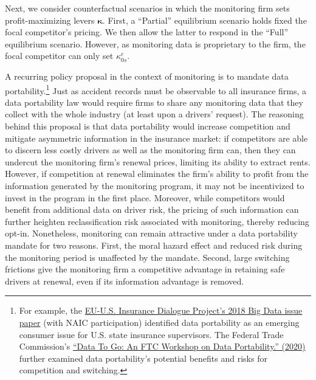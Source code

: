 Next, we consider counterfactual scenarios in which the monitoring firm sets profit-maximizing levers $\boldsymbol{\kappa}$. First, a ``Partial'' equilibrium scenario holds fixed the focal competitor's pricing. We then allow the latter to respond in the ``Full'' equilibrium scenario. However, as monitoring data is proprietary to the firm, the focal competitor can only set $\kappa^c_{0s}$.

A recurring policy proposal in the context of monitoring is to mandate data portability.\footnote{For example, the \href{https://home.treasury.gov/system/files/311/181031_EU\%20US\%20Big\%20Data\%20\%20Issue\%20Paper\_Publication.pdf}{EU-U.S. Insurance Dialogue Project's 2018 Big Data issue paper} (with NAIC participation) identified data portability as an emerging consumer issue for U.S. state insurance supervisors. The Federal Trade Commission's
\href{https://www.ftc.gov/system/files/documents/public_events/1568699/transcript-data-portability-workshop-final.pdf}{``Data To Go: An FTC Workshop on Data Portability.'' (2020)}
further examined data portability's potential benefits and risks for competition and switching.
} Just as accident records must be observable to all insurance firms, a data portability law would require firms to share any monitoring data that they collect with the whole industry (at least upon a drivers' request). The reasoning behind this proposal is that data portability would increase competition and mitigate asymmetric information in the insurance market: if competitors are able to discern less costly drivers as well as the monitoring firm can, then they can undercut the monitoring firm's renewal prices, limiting its ability to extract rents. However, if competition at renewal eliminates the firm's ability to profit from the information generated by the monitoring program, it may not be incentivized to invest in the program in the first place. Moreover, while competitors would benefit from additional data on driver risk, the pricing of such information can further heighten reclassification risk associated with monitoring, thereby reducing opt-in. Nonetheless, monitoring can remain attractive under a data portability mandate for two reasons. First, the moral hazard effect and reduced risk during the monitoring period is unaffected by the mandate. Second, large switching frictions give the monitoring firm a competitive advantage in retaining safe drivers at renewal, even if its information advantage is removed.

